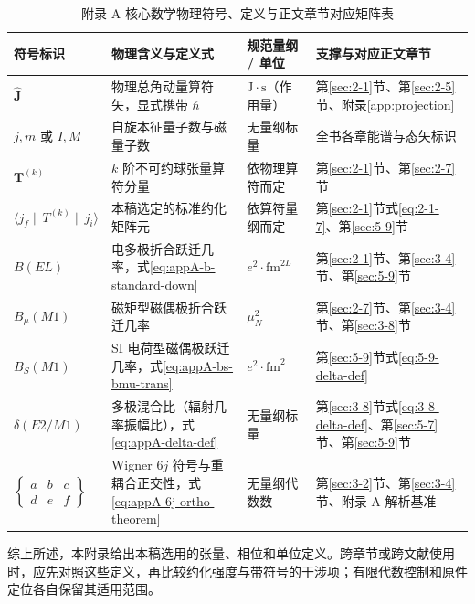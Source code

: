 \begin{table}[htbp]
\centering
\small
\caption{附录 A 核心数学物理符号、定义与正文章节对应矩阵表}\label{tab:appA-alignment-matrix}
\begin{tabularx}{\textwidth}{p{2.5cm} p{4.5cm} p{2.2cm} >{\raggedright\arraybackslash}X}
\toprule
符号标识 & 物理含义与定义式 & 规范量纲 / 单位 & 支撑与对应正文章节 \\
\midrule
$\hat{\mathbf{J}}$ & 物理总角动量算符矢，显式携带 $\hbar$ & $\mathrm{J}\cdot\mathrm{s}$（作用量） & 第\ref{sec:2-1}节、第\ref{sec:2-5}节、附录\ref{app:projection} \\
\addlinespace
$j, m$ 或 $I, M$ & 自旋本征量子数与磁量子数 & 无量纲标量 & 全书各章能谱与态矢标识 \\
\addlinespace
$\mathbf{T}^{(k)}$ & $k$ 阶不可约球张量算符分量 & 依物理算符而定 & 第\ref{sec:2-1}节、第\ref{sec:2-7}节 \\
\addlinespace
$\langle j_f \| T^{(k)} \| j_i \rangle$ & 本稿选定的标准约化矩阵元 & 依算符量纲而定 & 第\ref{sec:2-1}节式\eqref{eq:2-1-7}、第\ref{sec:5-9}节 \\
\addlinespace
$B(EL)$ & 电多极折合跃迁几率，式\eqref{eq:appA-b-standard-down} & $e^2\cdot\mathrm{fm}^{2L}$ & 第\ref{sec:2-1}节、第\ref{sec:3-4}节、第\ref{sec:5-9}节 \\
\addlinespace
$B_\mu(M1)$ & 磁矩型磁偶极折合跃迁几率 & $\mu_N^2$ & 第\ref{sec:2-7}节、第\ref{sec:3-4}节、第\ref{sec:3-8}节 \\
\addlinespace
$B_S(M1)$ & SI 电荷型磁偶极跃迁几率，式\eqref{eq:appA-bs-bmu-trans} & $e^2\cdot\mathrm{fm}^2$ & 第\ref{sec:5-9}节式\eqref{eq:5-9-delta-def} \\
\addlinespace
$\delta(E2/M1)$ & 多极混合比（辐射几率振幅比），式\eqref{eq:appA-delta-def} & 无量纲标量 & 第\ref{sec:3-8}节式\eqref{eq:3-8-delta-def}、第\ref{sec:5-7}节、第\ref{sec:5-9}节 \\
\addlinespace
$\begin{Bmatrix} a & b & c \\ d & e & f \end{Bmatrix}$ & Wigner $6j$ 符号与重耦合正交性，式\eqref{eq:appA-6j-ortho-theorem} & 无量纲代数数 & 第\ref{sec:3-2}节、第\ref{sec:3-4}节、附录 A 解析基准 \\
\bottomrule
\end{tabularx}
\end{table}

综上所述，本附录给出本稿选用的张量、相位和单位定义。跨章节或跨文献使用时，应先对照这些定义，再比较约化强度与带符号的干涉项；有限代数控制和原件定位各自保留其适用范围。
